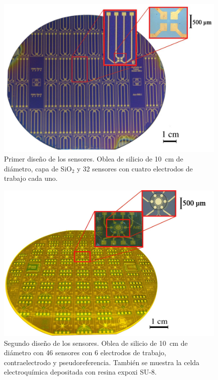 					  \begin{figure}[ht!]
					  \begin{center}
					  \includegraphics[width=\textwidth]{Imagenes/ObleaV1.jpg}
					  \caption[Electrodos, primera versión]{Primer diseño de los sensores. Oblea de silicio de \SI{10}{cm} de diámetro, capa de SiO$_2$ y 32 sensores con cuatro electrodos de trabajo cada uno.}
					  \label{fig:ObleaV1}
					  \end{center}
					  \end{figure} 	

					  \begin{figure}[ht!]
					  \begin{center}
					  \includegraphics[width=\textwidth]{Imagenes/ObleaV2.jpg}
					  \caption[Electrodos, segunda versión]{Segundo diseño de los sensores. Oblea de silicio de \SI{10}{cm} de diámetro con 46 sensores con 6 electrodos de trabajo, contraelectrodo y pseudoreferencia. También se muestra la celda electroquímica depositada con resina expoxi SU-8.}
					  \label{fig:ObleaV2}
					  \end{center}
					  \end{figure} 	
		
